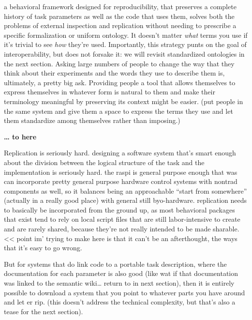 \documentclass{article}
\begin{document}
a behavioral framework designed for reproducibility, that preserves a
complete history of task parameters as well as the code that uses them,
solves both the problems of external inspection and replication without
needing to prescribe a specific formalization or uniform ontology. It
doesn't matter \emph{what} terms you use if it's trivial to see
\emph{how} they're used. Importantly, this strategy punts on the goal of
interoperability, but does not forsake it: we will revisit standardized
ontologies in the next section. Asking large numbers of people to change
the way that they think about their experiments and the words they use
to describe them is, ultimately, a pretty big ask. Providing people a
tool that allows themselves to express themselves in whatever form is
natural to them and make their terminology meaningful by preserving its
context might be easier. (put people in the same system and give them a
space to express the terms they use and let them standardize among
themselves rather than imposing.)

\textbf{\ldots{} to here}

Replication is seriously hard. designing a software system that's smart
enough about the division between the logical structure of the task and
the implementation is seriously hard. the raspi is general purpose
enough that was can incorporate pretty general purpose hardware control
systems with nontrad components as well, so it balances being an
approachable ``start from somewhere'' (actually in a really good place)
with general still byo-hardware. replication needs to basically be
incorporated from the ground up, as most behavioral packages that exist
tend to rely on local script files that are still labor-intensive to
create and are rarely shared, because they're not really intended to be
made sharable. \textless\textless{} point im' trying to make here is
that it can't be an afterthought, the ways that it's easy to go wrong.

But for systems that do link code to a portable task description, where
the documentation for each parameter is also good (like wat if that
documentation was linked to the semantic wiki\ldots{} return to in next
section), then it is entirely possible to download a system that you
point to whatever parts you have around and let er rip. (this doesn't
address the technical complexity, but that's also a tease for the next
section).
\end{document}
